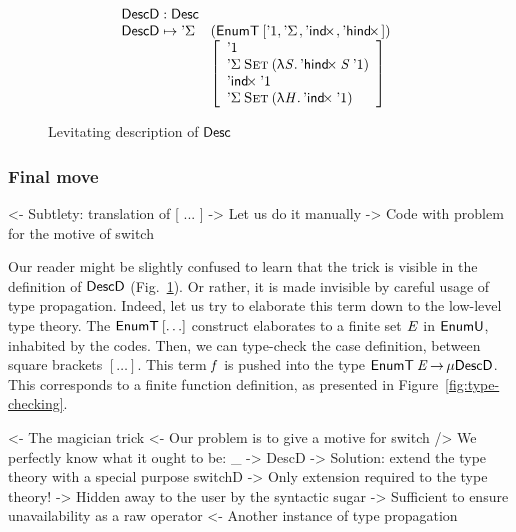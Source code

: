 \begin{figure}

\[\stk{
\DescD : \Desc \\
\begin{array}{@{}ll}
\DescD \mapsto \DSigma{\!}{\!} & (\EnumT{[ \DUnit, \DSigma{\!}{\!}, \DIndx{\!}, \DHindx{\!}{\!} ]}) \\
                           & \left[\begin{array}{l}
                                   \DUnit                                            \\
                                   \DSigma{\Set}{(\LAM{\V{S}} \DHindx{\V{S}}{\DUnit})}   \\
                                   \DIndx{\DUnit}                                    \\
                                   \DSigma{\Set}{(\LAM{\V{H}} \DIndx{\DUnit})}
                                   \end{array}
                             \right]
\end{array}
}\]

\caption{Levitating description of $\Desc$}
\label{fig:desc-levitate}

\end{figure}

\subsubsection{Final move}

\begin{wstructure}
<- Subtlety: translation of [ ... ]
    -> Let us do it manually
        -> Code with problem for the motive of switch
\end{wstructure}


Our reader might be slightly confused to learn that the trick is
visible in the definition of $\DescD$
(Fig.~\ref{fig:desc-levitate}). Or rather, it is made invisible by
careful usage of type propagation. Indeed, let us try to elaborate
this term down to the low-level type theory. The $\EnumT{[ \ldots ]}$
construct elaborates to a finite set $\V{E}$ in $\EnumU$, inhabited by
the codes. Then, we can type-check the case definition, between square
brackets $[ \ldots ]$. This term $\V{f}$ is pushed into the type
$\EnumT{\V{E}} \To \Mu{\DescD}$. This corresponds to a finite function
definition, as presented in Figure~\ref{fig:type-checking}.


\begin{wstructure}
<- The magician trick
    <- Our problem is to give a motive for switch
        /> We perfectly know what it ought to be: \_ -> DescD
    -> Solution: extend the type theory with a special purpose switchD
        -> Only extension required to the type theory!
        -> Hidden away to the user by the syntactic sugar
            -> Sufficient to ensure unavailability as a raw operator
            <- Another instance of type propagation
\end{wstructure}

